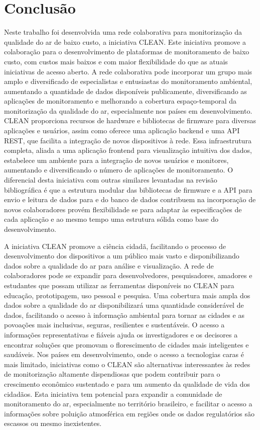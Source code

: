 \chapter{Conclusão}

Neste trabalho foi desenvolvida uma rede colaborativa para monitorização da qualidade do ar de baixo custo, a iniciativa CLEAN. Este iniciativa promove a colaboração para o desenvolvimento de plataformas de monitoramento de baixo custo, com custos mais baixos e com maior flexibilidade do que as atuais iniciativas de acesso aberto. A rede colaborativa pode incorporar um grupo mais amplo e diversificado de especialistas e entusiastas do monitoramento ambiental, aumentando a quantidade de dados disponíveis publicamente, diversificando as aplicações de monitoramento e melhorando a cobertura espaço-temporal da monitorização da qualidade do ar, especialmente nos países em desenvolvimento. CLEAN proporciona recursos de hardware e bibliotecas de firmware para diversas aplicações e usuários, assim como oferece uma aplicação backend e uma API REST, que facilita a integração de novos dispositivos à rede. Essa infraestrutura completa, aliada a uma aplicação frontend para visualização intuitiva dos dados, estabelece um ambiente para a integração de novos usuários e monitores, aumentando e diversificando o número de aplicações de monitoramento. O diferencial desta iniciativa com outras similares levantadas na revisão bibliográfica é que a estrutura modular das bibliotecas de firmware e a API para envio e leitura de dados para e do banco de dados contribuem na incorporação de novos colaboradores provém flexibilidade se para adaptar às especificações de cada aplicação e ao mesmo tempo uma estrutura sólida como base do desenvolvimento.

A iniciativa CLEAN promove a ciência cidadã, facilitando o processo de desenvolvimento dos dispositivos a um público mais vasto e disponibilizando dados sobre a qualidade do ar para análise e visualização. A rede de colaboradores pode se expandir para desenvolvedores, pesquisadores, amadores e estudantes que possam utilizar as ferramentas disponíveis no CLEAN para educação, prototipagem, uso pessoal e pesquisa. Uma cobertura mais ampla dos dados sobre a qualidade do ar disponibilizará uma quantidade considerável de dados, facilitando o acesso à informação ambiental para tornar as cidades e as povoações mais inclusivas, seguras, resilientes e sustentáveis. O acesso a informações representativas e fiáveis ajuda os investigadores e os decisores a encontrar soluções que promovam o florescimento de cidades mais inteligentes e saudáveis. Nos países em desenvolvimento, onde o acesso a tecnologias caras é mais limitado, iniciativas como o CLEAN são alternativas interessantes às redes de monitorização altamente dispendiosas que podem contribuir para o crescimento econômico sustentado e para um aumento da qualidade de vida dos cidadãos. Esta iniciativa tem potencial para expandir a comunidade de monitoramento do ar, especialmente no território brasileiro, e facilitar o acesso a informações sobre poluição atmosférica em regiões onde os dados regulatórios são escassos ou mesmo inexistentes.

